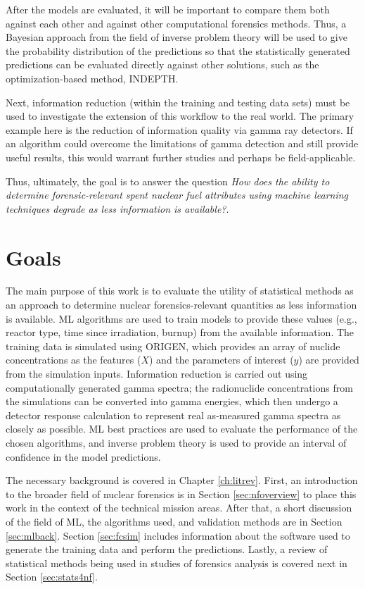 After the models are evaluated, it will be important to compare them both
against each other and against other computational forensics methods. Thus, a
Bayesian approach from the field of inverse problem theory will be used to give
the probability distribution of the predictions so that the statistically
generated predictions can be evaluated directly against other solutions, such
as the optimization-based method, \gls{INDEPTH}. 

Next, information reduction (within the training and testing data sets) must be
used to investigate the extension of this workflow to the real world. The
primary example here is the reduction of information quality via gamma ray
detectors.  If an algorithm could overcome the limitations of gamma detection
and still provide useful results, this would warrant further studies and
perhaps be field-applicable.

Thus, ultimately, the goal is to answer the question \textit{How does the
ability to determine forensic-relevant spent nuclear fuel attributes using
machine learning techniques degrade as less information is available?}. 

\section{Goals}

The main purpose of this work is to evaluate the utility of statistical methods
as an approach to determine nuclear forensics-relevant quantities as less
information is available. \Gls{ML} algorithms are used to train models
to provide these values (e.g., reactor type, time since irradiation, burnup)
from the available information. The training data is simulated using
\gls{ORIGEN}, which provides an array of nuclide concentrations as the features
($X$) and the parameters of interest ($y$) are provided from the simulation
inputs.  Information reduction is carried out using computationally generated
gamma spectra; the radionuclide concentrations from the simulations can be
converted into gamma energies, which then undergo a detector response
calculation to represent real as-measured gamma spectra as closely as possible.
\Gls{ML} best practices are used to evaluate the performance of the
chosen algorithms, and inverse problem theory is used to provide an interval of
confidence in the model predictions.

The necessary background is covered in Chapter \ref{ch:litrev}.  First, an
introduction to the broader field of nuclear forensics is in Section
\ref{sec:nfoverview} to place this work in the context of the technical mission
areas. After that, a short discussion of the field of \gls{ML}, the
algorithms used, and validation methods are in Section \ref{sec:mlback}.
Section \ref{sec:fcsim} includes information about the software used to generate
the training data and perform the predictions. Lastly, a review of statistical
methods being used in studies of forensics analysis is covered next in Section
\ref{sec:stats4nf}. 

